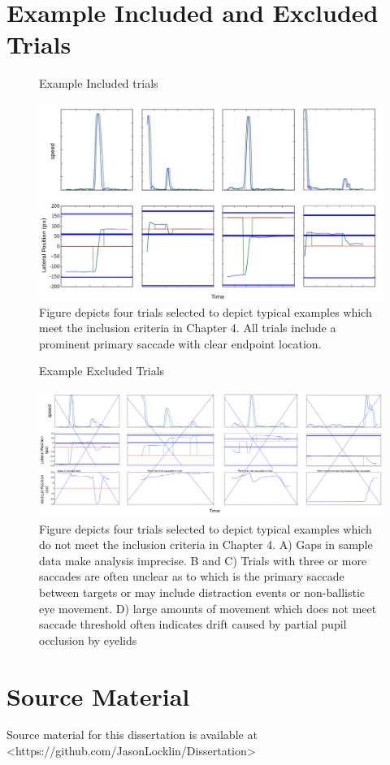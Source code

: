 \appendix
\chapter{Example Included and Excluded Trials}
\label{app}

\begin{figure}[p]
\centering
\begin{sffamily}
\large Example Included trials

\bigskip

\includegraphics[width=\textwidth]{appendix/accepted}
\end{sffamily}
\caption{Figure depicts four trials selected to depict typical
examples which meet the inclusion criteria in Chapter 4. All trials
include a prominent primary saccade with clear endpoint location.}
\end{figure}

\begin{figure}[p]
\centering
\begin{sffamily}
\large Example Excluded Trials

\bigskip

\includegraphics[width=\textwidth]{appendix/rejected}
\end{sffamily}
\caption{Figure depicts four trials selected to depict typical
examples which do not meet the inclusion criteria in Chapter 4. A) Gaps
in sample data make analysis imprecise. B and C) Trials with three or more saccades
are often unclear as to which is the primary saccade between targets or may include
distraction events or non-ballistic eye movement. 
D) large amounts of movement which does not meet saccade 
threshold often indicates drift caused by partial pupil occlusion by eyelids}
\end{figure}

\chapter{Source Material}

Source material for this dissertation is available at <https://github.com/JasonLocklin/Dissertation>
